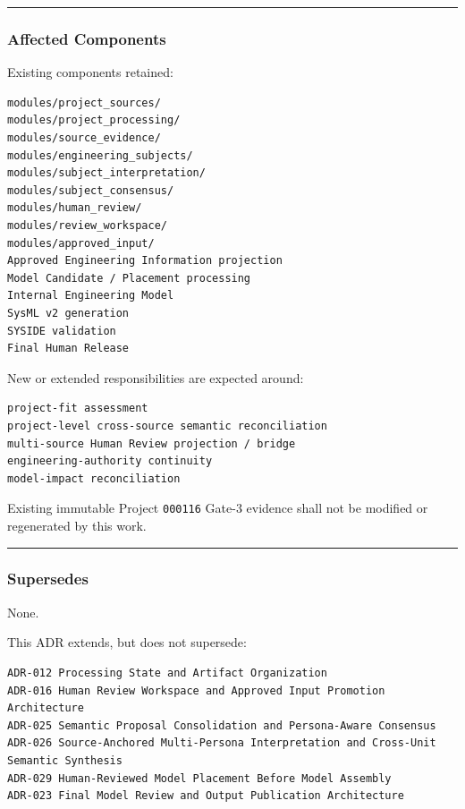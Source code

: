 \begin{center}\rule{0.5\linewidth}{0.5pt}\end{center}

\hypertarget{affected-components}{%
\subsubsection{Affected Components}\label{affected-components}}

Existing components retained:

\begin{verbatim}
modules/project_sources/
modules/project_processing/
modules/source_evidence/
modules/engineering_subjects/
modules/subject_interpretation/
modules/subject_consensus/
modules/human_review/
modules/review_workspace/
modules/approved_input/
Approved Engineering Information projection
Model Candidate / Placement processing
Internal Engineering Model
SysML v2 generation
SYSIDE validation
Final Human Release
\end{verbatim}

New or extended responsibilities are expected around:

\begin{verbatim}
project-fit assessment
project-level cross-source semantic reconciliation
multi-source Human Review projection / bridge
engineering-authority continuity
model-impact reconciliation
\end{verbatim}

Existing immutable Project \texttt{000116} Gate-3 evidence shall not be modified or regenerated by this work.

\begin{center}\rule{0.5\linewidth}{0.5pt}\end{center}

\hypertarget{supersedes}{%
\subsubsection{Supersedes}\label{supersedes}}

None.

This ADR extends, but does not supersede:

\begin{verbatim}
ADR-012 Processing State and Artifact Organization
ADR-016 Human Review Workspace and Approved Input Promotion Architecture
ADR-025 Semantic Proposal Consolidation and Persona-Aware Consensus
ADR-026 Source-Anchored Multi-Persona Interpretation and Cross-Unit Semantic Synthesis
ADR-029 Human-Reviewed Model Placement Before Model Assembly
ADR-023 Final Model Review and Output Publication Architecture
\end{verbatim}

